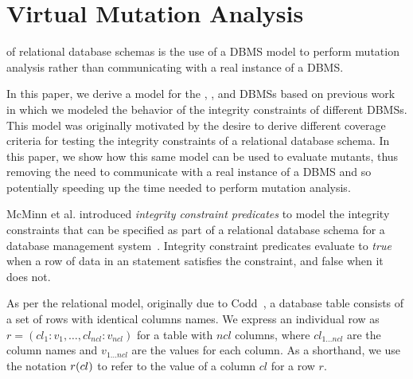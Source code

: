 


\vspace{-1ex}
\section{Virtual Mutation Analysis}
\label{sec:virtual-mutation-analysis}

\VMA of relational database schemas is the use of a DBMS model to perform mutation analysis rather than communicating with a real instance of a DBMS.

In this paper, we derive a model for the \HyperSQL, \Postgres, and \SQLite DBMSs based on previous work \cite{McMinn2015} in which we modeled the behavior of the integrity constraints of different DBMSs. This model was originally motivated by the desire to derive different coverage criteria for testing the integrity constraints of a relational database schema. In this paper, we show how this same model can be used to evaluate mutants, thus removing the need to communicate with a real instance of a DBMS and so potentially speeding up the time needed to perform mutation analysis.



McMinn et al. introduced {\it integrity constraint predicates} to model the integrity constraints that can be specified as part of a relational database schema for a database management system~\cite{McMinn2015}. Integrity constraint predicates evaluate to {\it true} when a row of data in an \INSERT statement satisfies the constraint, and false when it does not.

As per the relational model, originally due to Codd~\cite{Codd1970}, a database table consists of a set of rows with identical columns names. We express an individual row as $r = (cl_1:v_1, \dots, cl_{ncl}:v_{ncl})$ for a table with $ncl$ columns, where $cl_{1 \ldots ncl}$ are the column names and $v_{1 \ldots ncl}$ are the values for each column. As a shorthand, we use the notation $r (cl)$ to refer to the value of a column $cl$ for a row $r$.

